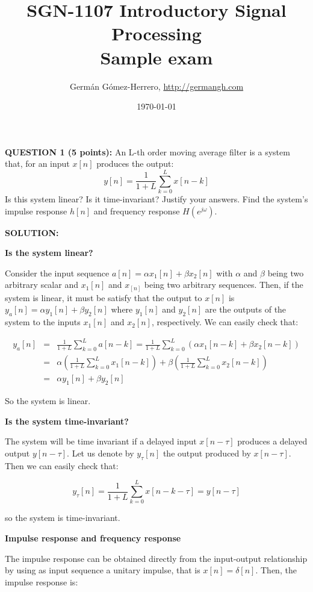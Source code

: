 \documentclass[a4paper,11pt,oneside]{article}
\title{SGN-1107 Introductory Signal Processing\\
Sample exam}
\date{\today}
\author{Germ\'an G\'omez-Herrero, \url{http://germangh.com}}
\begin{document}
\maketitle



\textbf{QUESTION 1 (5 points):} An L-th order moving average filter is a system that, for an input $x[n]$ produces the output:
\[
y[n] = \frac{1}{1+L}\sum_{k=0}^{L}x[n-k]
\]
Is this system linear? Is it time-invariant? Justify your answers. Find the system's impulse response $h[n]$ and frequency response $H(e^{j\omega})$.

\vspace{1cm}

\textbf{SOLUTION:}

\textbf{Is the system linear?}

Consider the input sequence $a[n]=\alpha x_1[n]+\beta x_2[n]$ with $\alpha$ and $\beta$ being two arbitrary scalar and $x_1[n]$ and $x_[n]$ being two arbitrary sequences. Then, if the system is linear, it must be satisfy that the output to $x[n]$ is $y_a[n]=\alpha y_1[n] + \beta y_2[n]$ where $y_1[n]$ and $y_2[n]$ are the outputs of the system to the inputs $x_1[n]$ and $x_2[n]$, respectively. We can easily check that:

\[
\begin{array}{lll}
y_a[n] &=& \frac{1}{1+L}\sum_{k=0}^{L}a[n-k]=\frac{1}{1+L}\sum_{k=0}^{L} \left(\alpha x_1[n-k]+\beta x_2[n-k]\right)\\
&=&\alpha\left(\frac{1}{1+L}\sum_{k=0}^{L}x_1[n-k]\right)+\beta\left(\frac{1}{1+L}\sum_{k=0}^{L}x_2[n-k]\right)\\
&=&\alpha y_1[n] + \beta y_2[n]
\end{array}
\]

So the system is linear.

\textbf{Is the system time-invariant?}

The system will be time invariant if a delayed input $x[n-\tau]$ produces a delayed output $y[n-\tau]$. Let us denote by $y_\tau[n]$ the output produced by $x[n-\tau]$. Then we can easily check that:

\[
y_\tau[n] = \frac{1}{1+L}\sum_{k=0}^{L}x[n-k-\tau]=y[n-\tau]
\]

so the system is time-invariant.

\textbf{Impulse response and frequency response}

The impulse response can be obtained directly from the input-output relationship by using as input sequence a unitary impulse, that is $x[n]=\delta[n]$. Then, the impulse response is:
\end{document}
